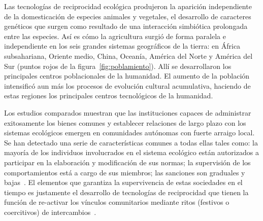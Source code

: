 \documentclass[a4paper,11pt]{book}
\theoremstyle{definition}
\begin{document}

Las tecnologías de reciprocidad ecológica produjeron la aparición independiente de la domesticación de especies animales y vegetales, el desarrollo de caracteres genéticos que surgen como resultado de una interacción simbiótica prolongada entre las especies.
%
Así es cómo la agricultura surgió de forma paralela e independiente en los seis grandes sistemas geográficos de la tierra: en África subsahariana, Oriente medio, China, Oceanía, América del Norte y América del Sur (puntos rojos de la figura~\ref{fig:poblamiento}).
%
Allí se desarrollaron los principales centros poblacionales de la humanidad.
El aumento de la población intensificó aun más los procesos de evolución cultural acumulativa, haciendo de estas regiones los principales centros tecnológicos de la humanidad.


Los estudios comparados muestran que las instituciones capaces de administrar exitosamente los bienes comunes y establecer relaciones de largo plazo con los sistemas ecológicos emergen en comunidades autónomas con fuerte arraigo local.
%
Se han detectado una serie de características comunes a todas ellas tales como: la mayoría de los individuos involucrados en el sistema ecológico están autorizados a participar en la elaboración y modificación de sus normas; la supervisión de los comportamientos está a cargo de sus miembros; las sanciones son graduales y bajas~\cite{ ostrom2010}.
%
El elementos que garantiza la supervivencia de estas sociedades en el tiempo es justamente el desarrollo de tecnologías de reciprocidad que tienen la función de re-activar los vínculos comunitarios mediante ritos (festivos o coercitivos) de intercambios~\cite{zaffaroni2013-cuestionCriminal, segato2016-guerraContraLasMujeres}.
\end{document}

